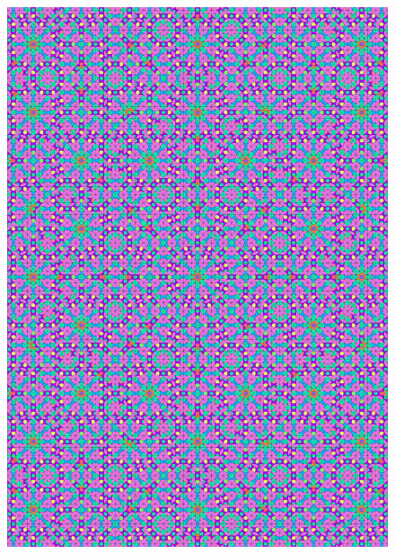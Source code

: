 \documentclass[text.tex]{subfiles}
\begin{document}
\begin{figure}[h!]
\centering
\includegraphics[width=1\textwidth]{img/results/octagon/quasi_polygon-octagon_206066_(1_3alpha_4).pdf}
\end{figure}
\end{document}
